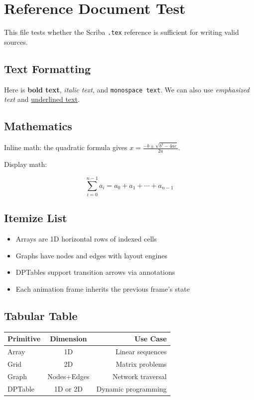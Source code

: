 \section{Reference Document Test}

This file tests whether the Scriba \texttt{.tex} reference is sufficient for writing valid sources.

\subsection{Text Formatting}

Here is \textbf{bold text}, \textit{italic text}, and \texttt{monospace text}.
We can also use \emph{emphasized text} and \underline{underlined text}.

\subsection{Mathematics}

Inline math: the quadratic formula gives $x = \frac{-b \pm \sqrt{b^2 - 4ac}}{2a}$.

Display math:

$$\sum_{i=0}^{n-1} a_i = a_0 + a_1 + \cdots + a_{n-1}$$

\subsection{Itemize List}

\begin{itemize}
\item Arrays are 1D horizontal rows of indexed cells
\item Graphs have nodes and edges with layout engines
\item DPTables support transition arrows via annotations
\item Each animation frame inherits the previous frame's state
\end{itemize}

\subsection{Tabular Table}

\begin{tabular}{|l|c|r|}
\hline
Primitive & Dimension & Use Case \\
\hline
Array & 1D & Linear sequences \\
\hline
Grid & 2D & Matrix problems \\
\hline
Graph & Nodes+Edges & Network traversal \\
\hline
DPTable & 1D or 2D & Dynamic programming \\
\hline
\end{tabular}

